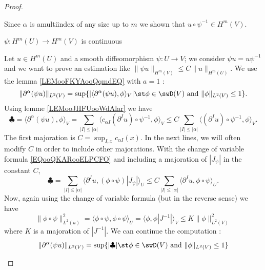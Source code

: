 \begin{proof}
\begin{subproof}
        Since \( \alpha\) is  amultiindex of any size up to \( m\) we shown that \( u\circ\psi^{-1}\in H^m(V)\).


        \item[\( \psi\colon H^m(U)\to H^m(V)\) is continuous]

            Let \( u\in H^m(U)\) and a smooth diffeomorphism \( \psi\colon U\to V\); we consider \( \psi u=u\psi^{-1}\) and we want to prove an estimation like \( \| \psi u \|_{H^m(V)}\leq C\| u \|_{H^m(U)}\). We use the lemma \ref{LEMooFKYAooQqmdEQ} with \( a=1\) :
            \begin{equation}
                \| \partial^{\alpha}(\psi u) \|_{L^2(V)}=\sup\{ | \langle \partial^{\alpha}(\psi u), \phi\rangle_V |\st \phi\in\swD(V)\text{ and }\| \phi \|_{L^2(V)}\leq 1 \}.
            \end{equation}
            Using lemme \ref{LEMooJHFUooWdAlar} we have
            \begin{equation}
                \clubsuit=\langle \partial^{\alpha}(\psi u), \phi\rangle_V=\sum_{| I |\leq | \alpha |}\langle c_{\alpha I}(\partial^Iu)\circ\psi^{-1}, \phi\rangle_V\leq C\sum_{| I |\leq | \alpha |}\langle (\partial^Iu)\circ \psi^{-1}, \phi\rangle_V.
            \end{equation}
            The first majoration is \( C=\sup_{I,x}c_{\alpha I}(x)\). In the next lines, we will often modify \( C\) in order to include other majorations. With the change of variable formula \eqref{EQooQKARooELPCFO} and including a majoration of \( | J_{\psi} |\) in the constant \( C\), 
            \begin{equation}
                \clubsuit=\sum_{| I |\leq | \alpha |}\langle \partial^Iu, (\phi\circ\psi)| J_{\psi} |\rangle_U\leq C\sum_{| I |\leq | \alpha |}\langle \partial^Iu, \phi\circ\psi\rangle_U.
            \end{equation}
            Now, again using the change of variable formula (but in the reverse sense) we have
            \begin{equation}
                \| \phi\circ\psi \|^2_{L^2(u)}=\langle \phi\circ\psi, \phi\circ\psi\rangle_U=\langle \phi, \phi| J^{-1} |\rangle_V\leq K\| \phi \|^2_{L^2(V)}
            \end{equation}
            where \( K\) is a majoration of \( | J^{-1} |\). We can continue the computation :
            \begin{subequations}
                \begin{align}
                    \| \partial^{\alpha}(\psi u) \|_{L^2(V)}&=\sup\{ | \clubsuit |\st \phi\in\swD(V)\text{ and }\| \phi \|_{L^2(V)}\leq 1 \}\\

\end{align}
\end{subequations}
\end{subproof}
\end{proof}
